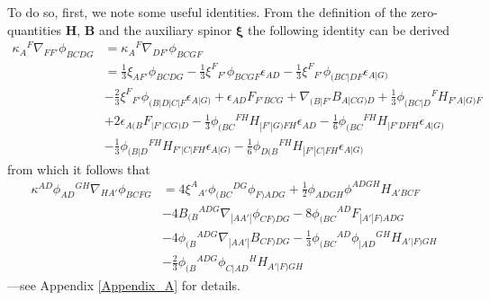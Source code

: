 \documentclass[10pt,a4paper]{article}
\theoremstyle{plain}
\def\bmB{{\bm B}}
\def\bmH{{\bm H}}
\begin{document}
To do so, first, we note some useful identities.  From the definition
of the zero-quantities $\bmH$, $\bmB$ and the auxiliary spinor
$\bm\xi$ the following identity can be derived
\begin{align}
    \kappa_{A}{}^{F} \nabla_{FF'}\phi_{BCDG} &=\kappa_{A}{}^{F}
    \nabla_{DF'}\phi_{BCGF} \nonumber\\ &= \tfrac{1}{3} \xi_{AF'}
    \phi_{BCDG} - \tfrac{1}{3} \xi^{F}{}_{F'} \phi_{BCGF}
    \epsilon_{AD} - \tfrac{1}{3}
    \xi^{F}{}_{F'}\phi_{(BC|DF}\epsilon_{A|G)} \nonumber \\ & -
    \tfrac{2}{3} \xi^{F}{}_{F'}\phi_{(B|D|C|F}\epsilon_{A|G)} +
    \epsilon_{AD} F_{F'BCG} + \nabla_{(B|F'}B_{A|CG)D} + \tfrac{1}{3}
    \phi_{(BC|D}{}^{F}H_{F'A|G)F} \nonumber \\& + 2
    \epsilon_{A(B}F_{|F'\vert CG)D} - \tfrac{1}{3}
    \phi_{(BC}{}^{FH}H_{|F'|G)FH}\epsilon_{AD} - \tfrac{1}{6}
    \phi_{(BC}{}^{FH}H_{|F'DFH}\epsilon_{A|G)} \nonumber\\ & -
    \tfrac{1}{3} \phi_{(B|D}{}^{FH}H_{F'|C|FH}\epsilon_{A|G)} -
    \tfrac{1}{6}
    \phi_{D(B}{}^{FH}H_{|F'|C|FH}\epsilon_{A|G)}\label{Eq:MiscIdentity2}
\end{align}
from which it follows that 
\begin{align}
    \kappa^{AD} \phi_{AD}{}^{GH} \nabla_{HA'}\phi_{BCFG} &= 4
    \xi^{A}{}_{A'}\phi_{(BC}{}^{DG}\phi_{F)ADG} + \tfrac{1}{2}
    \phi_{ADGH} \phi^{ADGH} H_{A'BCF} \nonumber\\ & - 4
    B_{(B}{}^{ADG}\nabla_{|AA'|}\phi_{CF)DG} - 8
    \phi_{(BC}{}^{AD}F_{|A'|F)ADG}\nonumber \\ & - 4
    \phi_{(B}{}^{ADG}\nabla_{|AA'|}B_{CF)DG} - \tfrac{1}{3}
    \phi_{(BC}{}^{AD}\phi_{|AD}{}^{GH}H_{A'|F)GH}\nonumber \\ & -
    \tfrac{2}{3}
    \phi_{(B}{}^{ADG}\phi_{C|AD}{}^{H}H_{A'|F)GH} \label{Eq:MiscIdentity3}
\end{align}
---see Appendix \ref{Appendix_A} for details.
\\
\end{document}
